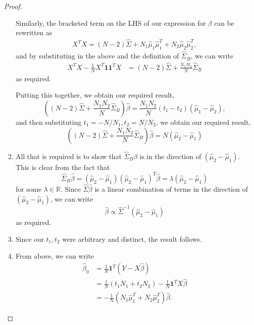 \begin{proof}
\begin{enumerate}
                Similarly, the bracketed term on the LHS of our expression for $\beta$ can be rewritten as \begin{align*}
                    X^T X = (N-2) \hat \Sigma + N_1 \hat \mu_1 \hat \mu_1^T + N_2 \hat \mu_2 \hat \mu_2^T,
                \end{align*} and by substituting in the above and the definition of $\hat \Sigma_B$, we can write \begin{align*}
                    X^T X - \frac{1}{N}X^T \mathbf{1} \mathbf{1}^T X &= (N-2) \hat \Sigma + \frac{N_1 N_2}{N} \hat \Sigma_B
                \end{align*} as required.

                Putting this together, we obtain our required result, \[
                    \left( (N-2) \hat \Sigma + \frac{N_1 N_2}{N} \hat \Sigma_B \right) \hat \beta = \frac{N_1 N_2}{N} (t_1 - t_2)(\hat \mu_1 - \hat \mu_2),
                \]
                and then substituting $t_1 = -N/N_1, t_2 = N/N_2$, we obtain our required result, \[
                    \left( (N-2) \hat \Sigma + \frac{N_1 N_2}{N} \hat \Sigma_B \right) \hat \beta = N(\hat \mu_2 - \hat \mu_1)
                \]
        \item All that is required is to show that $\hat \Sigma_B \beta$ is in the direction of $(\hat \mu_2 - \hat \mu_1)$.  This is clear from the fact that \[
                \hat \Sigma_B \hat \beta = (\hat \mu_2 - \hat \mu_1)(\hat \mu_2 - \hat \mu_1)^T \hat \beta = \lambda (\hat \mu_2 - \hat \mu_1)
                \] for some $\lambda \in \mathbb{R}$.  Since $\hat \Sigma \hat \beta$ is a linear combination of terms in the direction of $(\hat \mu_2 - \hat \mu_1)$, we can write \[
                    \hat \beta \propto \hat \Sigma^{-1} (\hat \mu_2 - \hat \mu_1)
                    \] as required.
        \item Since our $t_1, t_2$ were arbitrary and distinct, the result follows.
        \item From above, we can write \begin{align*}
                \hat \beta_0 &= \frac{1}{N} \mathbf{1}^T (Y - X \hat \beta) \\
                &= \frac{1}{N}(t_1 N_1 + t_2 N_2)  - \frac{1}{N} \mathbf{1}{^T} X \hat \beta \\
                &= -\frac{1}{N}(N_1 \hat \mu_1^T + N_2 \hat \mu_2^T) \hat \beta. 
            \end{align*}


\end{enumerate}
\end{proof}
